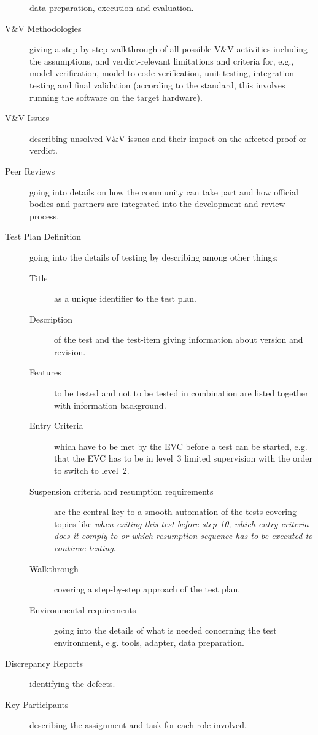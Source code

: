 \documentclass{template/openetcs_report}
\begin{document}
\begin{description}
  data preparation, execution and evaluation. 
\item[V\&V Methodologies] giving a step-by-step walkthrough of all
  possible V\&V activities including the assumptions, and
  verdict-relevant limitations and criteria for, e.g.,  model
  verification, model-to-code verification, unit testing, integration
  testing and final validation (according to the standard, this
  involves running the software on the target hardware).  
\item[V\&V Issues] describing unsolved V\&V issues and their impact on
  the affected proof or verdict. 
\item[Peer Reviews] going into details on how the community can take
  part and how official bodies and partners are integrated into the
  development and review process. 
\item[Test Plan Definition] going into the details of testing by
  describing among other things: 

\begin{description} 
\item[Title] as a unique identifier to the test plan.
\item[Description] of the test and the test-item giving information
  about version and revision. 
\item[Features] to be tested and not to be tested in combination are
  listed together with information background.  
\item[Entry Criteria] which have to be met by the EVC before a test
  can be started, e.g. that the EVC has to be in level~3 limited
  supervision with the order to switch to level~2. 
\item[Suspension criteria and resumption requirements] are the central
  key to a smooth automation of the tests covering topics like
  \emph{when exiting this test before step 10, which entry criteria
    does it comply to or which resumption sequence has to be executed
    to continue testing}. 
\item[Walkthrough] covering a step-by-step approach of the test plan.
\item[Environmental requirements] going into the details of what is
  needed concerning the test environment, e.g. tools, adapter, data
  preparation. 
\end{description}

\item[Discrepancy Reports] identifying the defects.
\item[Key Participants] describing the assignment and task for each
  role involved.  


\end{description}
\end{document}
